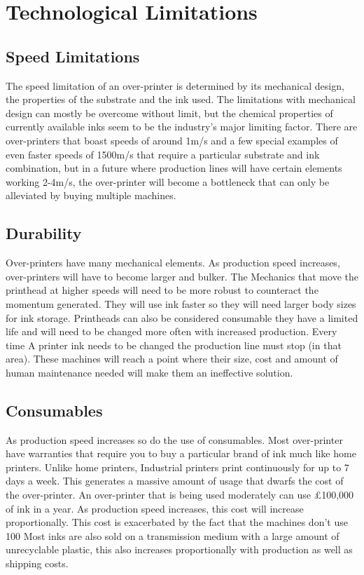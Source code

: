 \chapter{Technological Limitations}
\pagestyle{fancy}

\section{Speed Limitations}
The speed limitation of an over-printer is determined by its mechanical design, the properties of the substrate and the ink used. The limitations with mechanical design can mostly be overcome without limit, but the chemical properties of currently available inks seem to be the industry's major limiting factor. 
There are over-printers that boast speeds of around 1m/s and a few special examples of even faster speeds of 1500m/s that require a particular substrate and ink combination, but in a future where production lines will have certain elements working  2-4m/s, the over-printer will become a bottleneck that can only be alleviated by buying multiple machines.

\section{Durability}
Over-printers have many mechanical elements. As production speed increases, over-printers will have to become larger and bulker.  The Mechanics that move the printhead at higher speeds will need to be more robust to counteract the momentum generated. They will use ink faster so they will need larger body sizes for ink storage.
Printheads can also be considered consumable they have a limited life and will need to be changed more often with increased production. Every time A printer ink needs to be changed the production line must stop (in that area).
These machines will reach a point where their size, cost and amount of human maintenance needed will make them an ineffective solution.

\section{Consumables}

As production speed increases so do the use of consumables. Most over-printer have warranties that require you to buy a particular brand of ink much like home printers. Unlike home printers, Industrial printers print continuously for up to 7 days a week. This generates a massive amount of usage that dwarfs the cost of the over-printer. An over-printer that is being used moderately can use £100,000 of ink in a year. As production speed increases, this cost will increase proportionally.
This cost is exacerbated by the fact that the machines don’t use 100%
Most inks are also sold on a transmission medium with a large amount of unrecyclable plastic, this also increases proportionally with production as well as shipping costs.








